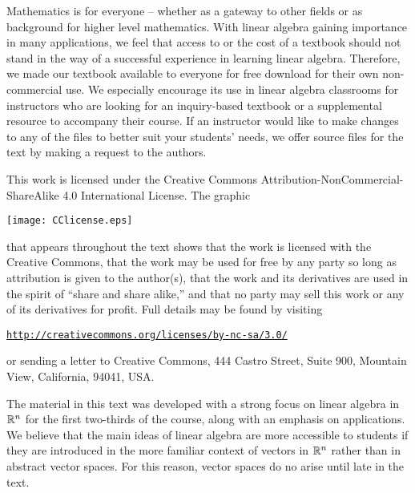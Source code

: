 \label{chap:preface}

\label{sec:pref_opensrc}
 
Mathematics is for everyone -- whether as a gateway to other fields or as background for higher level mathematics. With linear algebra gaining importance in many applications, we feel that access to or the cost of a textbook should not stand in the way of a successful experience in learning linear algebra. Therefore, we made our textbook available to everyone for free download for their own non-commercial use. We especially encourage its use in linear algebra classrooms for instructors who are looking for an inquiry-based textbook or a supplemental resource to accompany their course. If an instructor would like to make changes to any of the files to better suit your students' needs, we offer source files for the text by making a request to the authors.

This work is licensed under the Creative Commons Attribution-NonCommercial-ShareAlike 4.0 International License.  The graphic 
\begin{center}
\texttt{[image: CClicense.eps]}
\end{center}
that appears throughout the text shows that the work is licensed with the Creative Commons, that the work may be used for free by any party so long as attribution is given to the author(s), that the work and its derivatives are used in the spirit of ``share and share alike,'' and that no party may sell this work or any of its derivatives for profit.  Full details may be found by visiting
\begin{center}
\href{http://creativecommons.org/licenses/by-nc-sa/3.0/}{\texttt{http://creativecommons.org/licenses/by-nc-sa/3.0/}}
\end{center} 
or sending a letter to Creative Commons, 444 Castro Street, Suite 900, Mountain View, California, 94041, USA. 

\label{sec:pref_motivate}

The material in this text was developed with a strong focus on linear algebra in $\mathbb{R}^n$ for the first two-thirds of the course, along with an emphasis on applications. We believe that the main ideas of linear algebra are more accessible to students if they are introduced in the more familiar context of vectors in $\mathbb{R}^n$ rather than in abstract vector spaces. For this reason, vector spaces do no arise until late in the text. 

